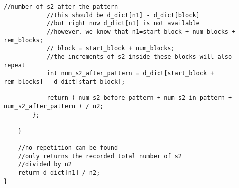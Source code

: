 \begin{lstlisting}[style=customc, caption={Find Repeat Pattern}]
            //number of s2 after the pattern
            //this should be d_dict[n1] - d_dict[block]
            //but right now d_dict[n1] is not available
            //however, we know that n1=start_block + num_blocks + rem_blocks;
            // block = start_block + num_blocks;
            //the increments of s2 inside these blocks will also repeat
            int num_s2_after_pattern = d_dict[start_block + rem_blocks] - d_dict[start_block];

            return ( num_s2_before_pattern + num_s2_in_pattern + num_s2_after_pattern ) / n2;
        };

    }

    //no repetition can be found
    //only returns the recorded total number of s2
    //divided by n2
    return d_dict[n1] / n2;
}
\end{lstlisting}

